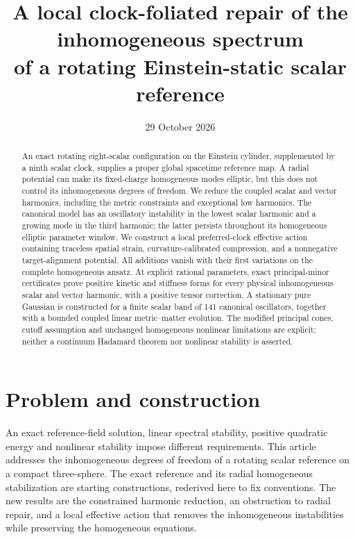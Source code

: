 \documentclass[11pt]{article}
\title{A local clock-foliated repair of the inhomogeneous spectrum\\of a rotating Einstein-static scalar reference}
\author{}
\date{29 October 2026}
\numberwithin{equation}{section}
\begin{document}
\maketitle
\begin{abstract}
An exact rotating eight-scalar configuration on the Einstein cylinder, supplemented by a ninth scalar clock, supplies a proper global spacetime reference map.
A radial potential can make its fixed-charge homogeneous modes elliptic, but this does not control its inhomogeneous degrees of freedom.
We reduce the coupled scalar and vector harmonics, including the metric constraints and exceptional low harmonics.
The canonical model has an oscillatory instability in the lowest scalar harmonic and a growing mode in the third harmonic; the latter persists throughout its homogeneous elliptic parameter window.
We construct a local preferred-clock effective action containing traceless spatial strain, curvature-calibrated compression, and a nonnegative target-alignment potential.
All additions vanish with their first variations on the complete homogeneous ansatz.
At explicit rational parameters, exact principal-minor certificates prove positive kinetic and stiffness forms for every physical inhomogeneous scalar and vector harmonic, with a positive tensor correction.
A stationary pure Gaussian is constructed for a finite scalar band of 141 canonical oscillators, together with a bounded coupled linear metric--matter evolution.
The modified principal cones, cutoff assumption and unchanged homogeneous nonlinear limitations are explicit; neither a continuum Hadamard theorem nor nonlinear stability is asserted.
\end{abstract}

\section{Problem and construction}

An exact reference-field solution, linear spectral stability, positive quadratic energy and nonlinear stability impose different requirements.
This article addresses the inhomogeneous degrees of freedom of a rotating scalar reference on a compact three-sphere.
The exact reference and its radial homogeneous stabilization are starting constructions, rederived here to fix conventions.
The new results are the constrained harmonic reduction, an obstruction to radial repair, and a local effective action that removes the inhomogeneous instabilities while preserving the homogeneous equations.
\end{document}
